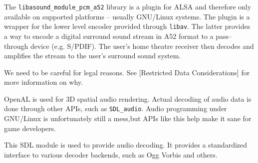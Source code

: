 

\startitemize[4]


The {\tt libasound_module_pcm_a52} library is a plugin for ALSA and therefore only available on supported platforms  -- usually GNU/Linux systems. The plugin is a wrapper for the lower level encoder provided through {\tt libav}. The latter provides a way to encode a digital surround sound stream in A52 format to a pass--through device (e.g. S/PDIF). The user's home theatre receiver then decodes and amplifies the stream to the user's surround sound system.

We need to be careful for legal reasons. See [Restricted Data Considerations] for more information on why.




OpenAL is used for 3D spatial audio rendering. Actual decoding of audio data is done through other APIs, such as {\tt SDL_audio}. Audio programming under GNU/Linux is unfortunately still a mess, but APIs like this help make it sane for game developers.


This SDL module is used to provide audio decoding. It provides a standardized interface to various decoder backends, such as Ogg Vorbis and others.
\stopitemize

